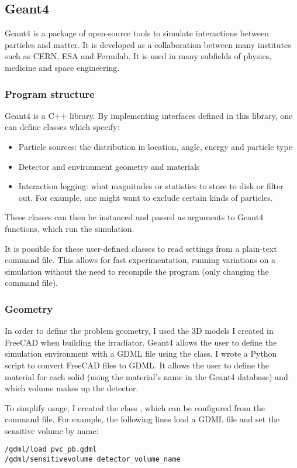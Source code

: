 \subsection{Geant4}
Geant4 is a package of open-source tools
to simulate interactions between particles and matter.
It is developed as a collaboration between many institutes
such as CERN, ESA and Fermilab.
It is used in many subfields of physics, medicine and space engineering.
\subsubsection{Program structure}
Geant4 is a C++ library.
By implementing interfaces defined in this library,
one can define classes which specify:
\begin{itemize}
    \item Particle sources: the distribution in location, angle, energy and particle type
    \item Detector and environment geometry and materials
    \item Interaction logging: what magnitudes or statistics
        to store to disk or filter out. For example, one might want to exclude certain kinds of particles.
\end{itemize}
These classes can then be instanced and passed as arguments to Geant4 functions,
which run the simulation.

It is possible for these user-defined classes to read settings from a plain-text command file.
This allows for fast experimentation, running variations on a simulation
without the need to recompile the program (only changing the command file).
\subsubsection{Geometry}
In order to define the problem geometry,
I used the 3D models I created in FreeCAD when building the irradiator.
Geant4 allows the user to define the simulation environment with a GDML file\cite{chytracek_geometry_2006}
using the  class.
I wrote a Python script to convert 
FreeCAD  files to GDML.
It allows the user to define the material for each solid
(using the material's name in the Geant4 database)
and which volume makes up the detector.

To simplify usage, I created the class 
,
which can be configured from the command file.
For example, the following lines load a GDML file
and set the sensitive volume by name:
\begin{verbatim}
/gdml/load pvc_pb.gdml
/gdml/sensitivevolume detector_volume_name
\end{verbatim}

